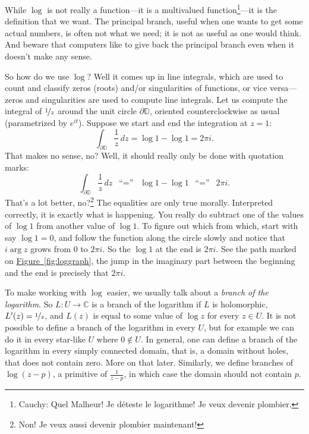 \documentclass[12pt,openany]{book}
\newcommand{\C}{{\mathbb{C}}}
\newcommand{\D}{{\mathbb{D}}}
\newcommand{\myindex}[1]{#1\index{#1}}
\theoremstyle{plain}
\theoremstyle{remark}
\theoremstyle{definition}
\theoremstyle{exercise}
\theoremstyle{example}
\newcommand{\figureref}[1]{\hyperref[#1]{Figure~\ref*{#1}}}
\begin{document}
While $\log$ is not really a function---it is a multivalued
function\footnote{%
Cauchy: Quel Malheur!  Je d{\'e}teste le logarithme! Je veux devenir plombier.}---it is
the definition that we want.
The principal branch,
useful when one wants to get some actual numbers, is often not what we
need; it is not as useful as one would think.
And beware that computers like to give back the principal branch even 
when it doesn't make any sense.

So how do we use $\log$?  Well it comes up in line integrals, which are used
to count and classify zeros (roots) and/or singularities of functions, or vice
versa---zeros and singularities are used to compute line integrals.
Let us compute the integral of $\nicefrac{1}{z}$ around the unit
circle $\partial \D$, oriented counterclockwise as usual (parametrized
by $e^{it}$).  Suppose we start and end the integration at 
$z=1$:
\begin{equation*}
\int_{\partial \D} \frac{1}{z} \, dz
= \log 1 - \log 1 = 2\pi i.
\end{equation*}
That makes no sense, no?  Well, it should really only be done
with quotation marks:
\begin{equation*}
\int_{\partial \D} \frac{1}{z} \, dz
\enspace
\text{``$=$''}
\enspace
\log 1 - \log 1
\enspace
\text{``$=$''}
\enspace
2\pi i.
\end{equation*}
That's a lot better,
no?\footnote{Non! Je veux aussi devenir plombier maintenant!}
The equalities are only true morally.
Interpreted correctly, it is exactly what is happening.  You really do subtract
one of the values of $\log 1$ from another value of $\log 1$.  To figure
out which from which, start with say $\log 1 = 0$, and follow the
function along the circle slowly and notice that $i \arg z$ grows from $0$ to
$2\pi i$.  So the $\log 1$ at the end is $2 \pi i$.  See the path
marked on \figureref{fig:loggraph}, the jump in the imaginary part between
the beginning and the end is precisely that $2\pi i$.

To make working with $\log$ easier, we usually talk about a
\emph{\myindex{branch of the logarithm}}.  So $L \colon U \to \C$ is a branch
of the logarithm if $L$ is holomorphic, $L'(z) = \nicefrac{1}{z}$, and $L(z)$ is equal
to some value of $\log z$ for every $z \in U$.  It is not possible to define
a branch of the logarithm in every $U$, but for example we can do it in every
star-like $U$ where $0 \notin U$.  In general, one can define a branch of
the logarithm in every simply connected domain, that is, a domain without holes,
that does not contain zero.
More on that later.  Similarly, we define branches of $\log (z-p)$,
a primitive of $\frac{1}{z-p}$, in which case the domain
should not contain $p$.
\end{document}
